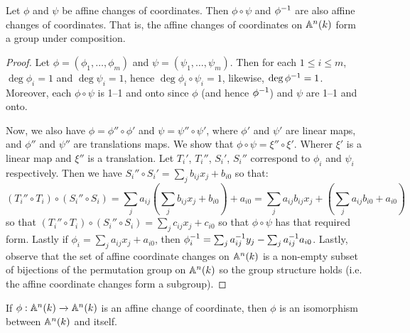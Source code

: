 \begin{theorem}\label{theorem_2.2.3}
  Let $\phi$ and $\psi$ be affine changes of coordinates. Then $\phi \circ \psi$
  and $\phi^{-1}$ are also affine changes of coordinates. That is, the affine
  changes of coordinates on $\mathbb{A}^n(k)$ form a group under composition.
\end{theorem}
\begin{proof}
  Let $\phi=(\phi_1, \dots, \phi_m)$ and $\psi=(\psi_1, \dots, \psi_m)$. Then
  for each $1 \leq i \leq m$, $\deg{\phi_i}=1$ and $\deg{\psi_i}=1$, hence
  $\deg{\phi_i \circ \psi_i}=1$, likewise, $\deg{\phi^{-1}}=1$. Moreover, each
  $\phi \circ \psi$ is 1--1 and onto since $\phi$ (and hence $\phi^{-1}$) and
  $\psi$ are 1--1 and onto.

  Now, we also have $\phi=\phi'' \circ \phi'$ and $\psi=\psi'' \circ \psi'$,
  where $\phi'$ and $\psi'$ are linear maps, and $\phi''$ and  $\psi''$ are
  translations maps. We show that $\phi \circ \psi=\xi'' \circ \xi'$. Wherer
  $\xi'$ is a linear map and  $\xi''$ is a translation. Let $T_i'$,  $T_i''$,
  $S_i'$,  $S_i''$ correspond to $\phi_i$ and  $\psi_i$ respectively. Then we
  have $S_i'' \circ S_i'=\sum_{j}{b_{ij}x_j}+b_{i0}$ so that:
  \begin{equation*}
    (T_i'' \circ T_i) \circ (S_i'' \circ S_i)=
    \sum_{j}{a_{ij}(\sum_{j}{b_{ij}x_j}+b_{i0})}+a_{i0}=
    \sum_j{a_{ij}b_{ij}x_j}+(\sum_{j}{a_{ij}b_{i0}}+a_{i0})
  \end{equation*}
  so that $(T_i'' \circ T_i) \circ (S_i'' \circ S_i)=\sum_{j}{c_{ij}x_j}+c_{i0}$
  so that $\phi \circ \psi$ has that required form. Lastly if
  $\phi_i=\sum_{j}{a_{ij}x_j}+a_{i0}$, then
  $\phi^{-1}_i=\sum_{j}{a_{ij}^{-1}y_j}-\sum_j{a_{ij}^{-1}a_{i0}}$. Lastly,
  observe that the set of affine coordinate changes on $\mathbb{A}^n(k)$ is a non-empty
  subset of bijections of the permutation group on $\mathbb{A}^n(k)$ so the group
  structure holds (i.e. the affine coordinate changes form a subgroup).
\end{proof}
\begin{corollary}
  If $\phi:\mathbb{A}^n(k) \xrightarrow{} \mathbb{A}^n(k)$ is an affine change of coordinate,
  then $\phi$ is an isomorphism between $\mathbb{A}^n(k)$ and itself.
\end{corollary}
